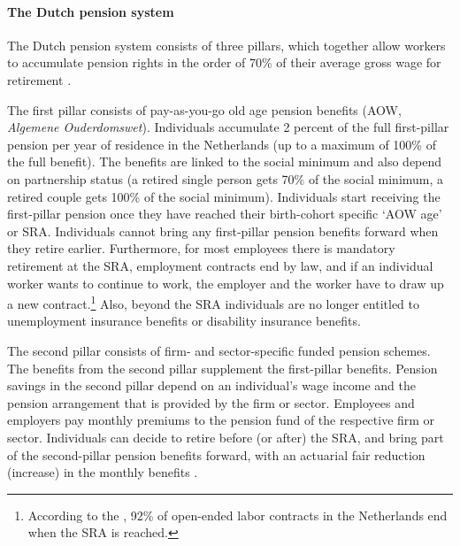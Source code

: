 \documentclass[12pt,a4paper]{article}
\begin{document}
\paragraph{The Dutch pension system} 
The Dutch pension system consists of three pillars, which together allow workers to accumulate pension rights in the order of 70\% of their average gross wage for retirement \citep{knoef_et_al_2017}. 

The first pillar consists of pay-as-you-go old age pension benefits (AOW, \textit{Algemene Ouderdomswet}). Individuals accumulate 2 percent of the full first-pillar pension per year of residence in the Netherlands (up to a maximum of 100\% of the full benefit). The benefits are linked to the social minimum and also depend on partnership status (a retired single person gets 70\% of the social minimum, a retired couple gets 100\% of the social minimum). Individuals start receiving the first-pillar pension once they have reached their birth-cohort specific `AOW age' or SRA. 
Individuals cannot bring any first-pillar pension benefits forward when they retire earlier. Furthermore, for most employees there is mandatory retirement at the SRA, employment contracts end by law, and if an individual worker wants to continue to work, the employer and the worker have to draw up a new contract.\footnote{According to the \citet[][p. 94]{oecd_2014}, 92\% of open-ended labor contracts in the Netherlands end when the SRA is reached.} Also, beyond the SRA individuals are no longer entitled to unemployment insurance benefits or disability insurance benefits.

The second pillar consists of firm- and sector-specific 
funded pension schemes. The benefits from the second pillar supplement the first-pillar benefits. Pension savings in the second pillar depend on an individual's wage income and the pension arrangement that is provided by the firm or sector. Employees and employers pay monthly premiums to the pension fund of the respective firm or sector. 
Individuals can decide to retire before (or after) the SRA, and bring part of the second-pillar pension benefits forward, with an actuarial fair reduction (increase) in the monthly benefits \citep{de_vos_social_2019}.
\end{document}
